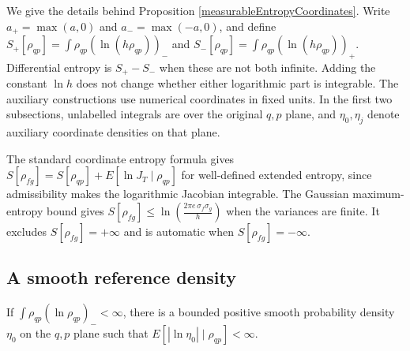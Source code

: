 \documentclass{techbrief}
\begin{document}
We give the details behind Proposition \ref{measurableEntropyCoordinates}. Write $a_+=\max(a,0)$ and $a_-=\max(-a,0)$, and define $S_+[\rho_{qp}]=\int\rho_{qp}(\ln(h\rho_{qp}))_-$ and $S_-[\rho_{qp}]=\int\rho_{qp}(\ln(h\rho_{qp}))_+$. Differential entropy is $S_+-S_-$ when these are not both infinite. Adding the constant $\ln h$ does not change whether either logarithmic part is integrable. The auxiliary constructions use numerical coordinates in fixed units. In the first two subsections, unlabelled integrals are over the original $q,p$ plane, and $\eta_0,\eta_j$ denote auxiliary coordinate densities on that plane.

The standard coordinate entropy formula \cite[Lemma 2]{RioulCosta} gives $S[\rho_{fg}]=S[\rho_{qp}]+E[\ln J_T\mid\rho_{qp}]$ for well-defined extended entropy, since admissibility makes the logarithmic Jacobian integrable. The Gaussian maximum-entropy bound \cite[Section 8.6]{CoverThomas} gives $S[\rho_{fg}]\leq\ln\left(\frac{2\pi e\,\sigma_f\sigma_g}{h}\right)$ when the variances are finite. It excludes $S[\rho_{fg}]=+\infty$ and is automatic when $S[\rho_{fg}]=-\infty$.

\subsection{A smooth reference density}

\begin{lemma}\label{smoothReference}
	If $\int\rho_{qp}(\ln\rho_{qp})_-<\infty$, there is a bounded positive smooth probability density $\eta_0$ on the $q,p$ plane such that $E[|\ln\eta_0|\mid\rho_{qp}]<\infty$.
\end{lemma}
\end{document}
